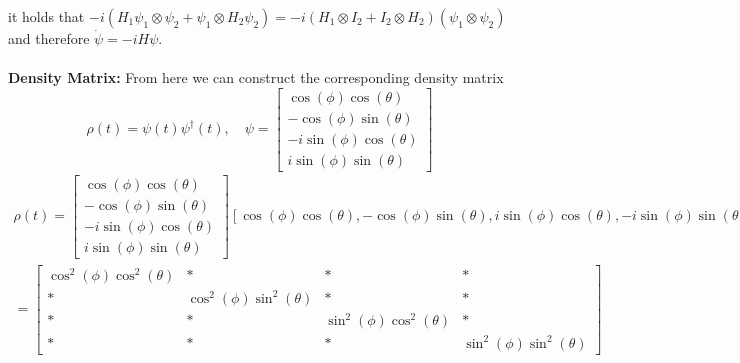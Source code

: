 \documentclass[11pt]{article}
\begin{document}
it holds that $-i(H_1\psi_1\otimes \psi_2 + \psi_1\otimes H_2\psi_2) = -i(H_1\otimes I_2 + I_2 \otimes H_2)(\psi_1 \otimes \psi_2)$ and therefore $\dot{\psi} = -iH\psi$.\\\\
\textbf{Density Matrix:}
From here we can construct the corresponding density matrix
\begin{equation}
  \rho(t) = \psi(t)\psi^\dag(t), \quad
  \psi =
  \begin{bmatrix}
    \cos(\phi)\cos(\theta)\\
    -\cos(\phi)\sin(\theta)\\
    -i\sin(\phi)\cos(\theta)\\
    i\sin(\phi)\sin(\theta)
  \end{bmatrix}
\end{equation}
\begin{multline}
  \rho(t) =
  \begin{bmatrix}
    \cos(\phi)\cos(\theta)\\
    -\cos(\phi)\sin(\theta)\\
    -i\sin(\phi)\cos(\theta)\\
    i\sin(\phi)\sin(\theta)
  \end{bmatrix}
  \left[
    \cos(\phi)\cos(\theta),
    -\cos(\phi)\sin(\theta),
    i\sin(\phi)\cos(\theta),
    -i\sin(\phi)\sin(\theta)
  \right] \\
  =
  \begin{bmatrix}
    \cos^2(\phi)\cos^2(\theta) & * & * & * \\
    * & \cos^2(\phi)\sin^2(\theta) & * & * \\
    * & * & \sin^2(\phi)\cos^2(\theta) & * \\
    * & * & * & \sin^2(\phi)\sin^2(\theta)
  \end{bmatrix}
\end{multline}
\end{document}
